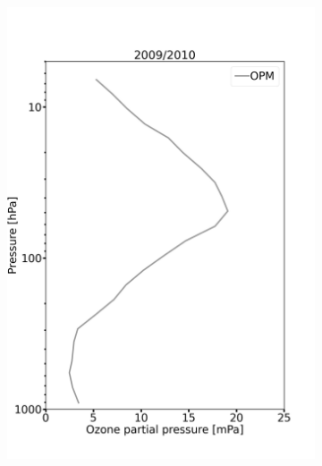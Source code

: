 \documentclass{article}
\begin{document}
    \begin{figure}
        \begin{subfigure}[t]{0.27\textwidth}
            \includegraphics[width=\linewidth]{png/profile_unc__sm_hv_0910_TRRM_SPC1010}
        \end{subfigure}%
    \hspace{-0.55cm}
        \begin{subfigure}[t]{0.27\textwidth}

\end{subfigure}
\end{figure}
\end{document}
